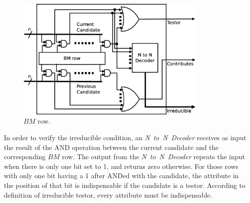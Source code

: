 \documentclass[authoryear,preprint,review,12pt]{elsarticle}
\begin{document}
\begin{figure}[htb]
    \begin{center}
        \includegraphics[height=6cm]{BM_row.eps}
    \end{center}
\caption{$BM$ row.}
\label{fig:row}
\end{figure}

In order to verify the irreducible condition, an \textit{N~to~N~Decoder}
receives as input the result of the AND operation between the current candidate and the corresponding $BM$ row.
The output from the \textit{N~to~N~Decoder} repeats the input when there is only one bit set
to 1, and returns zero otherwise. For those rows with only one bit having a 1 after ANDed with the candidate,
the attribute in the position of that bit is indispensable if the candidate is a testor.
According to definition of irreducible testor, every attribute must be indispensable. %
\end{document}
